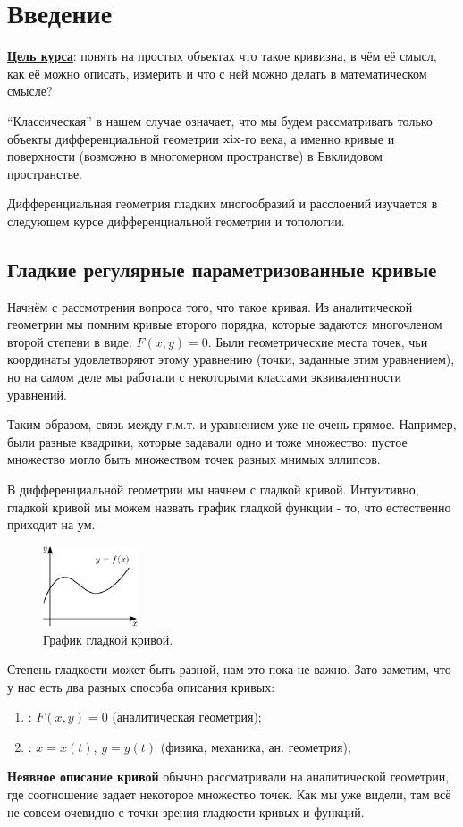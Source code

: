 \documentclass[12pt]{article}
\newcommand{\RN}[1]{%
	\textup{\uppercase\expandafter{\romannumeral#1}}%
}
\theoremstyle{definition}
\begin{document}
\section*{Введение}
\uline{\textbf{Цель курса}}: понять на простых объектах что такое кривизна, в чём её смысл, как её можно описать, измерить и что с ней можно делать в математическом смысле? 

``Классическая'' в нашем случае означает, что мы будем рассматривать только объекты дифференциальной геометрии $\RN{19}$-го века, а именно кривые и поверхности (возможно в многомерном пространстве) в Евклидовом пространстве. 

Дифференциальная геометрия гладких многообразий и расслоений изучается в следующем курсе дифференциальной геометрии и топологии.

\subsection*{Гладкие регулярные параметризованные кривые}
Начнём с рассмотрения вопроса того, что такое кривая. Из аналитической геометрии мы помним кривые второго порядка, которые задаются многочленом второй степени в виде: $F(x,y) = 0$. Были геометрические места точек, чьи координаты удовлетворяют этому уравнению (точки, заданные этим уравнением), но на самом деле мы работали с некоторыми классами эквивалентности уравнений. 

Таким образом, связь между г.м.т. и уравнением уже не очень прямое. Например, были разные квадрики, которые задавали одно и тоже множество: пустое множество могло быть множеством точек разных мнимых эллипсов. 

В дифференциальной геометрии мы начнем с гладкой кривой. Интуитивно, гладкой кривой мы можем назвать график гладкой функции - то, что естественно приходит на ум.

\begin{figure}[H]
	\centering
	\includegraphics[width=0.25\textwidth]{CDGL1_1.eps}
	\caption{График гладкой кривой.}
	\label{1_1}
\end{figure}
Степень гладкости может быть разной, нам это пока не важно. Зато заметим, что у нас есть два разных способа описания кривых:
\begin{enumerate}[label=\arabic*)]
	\item {}: $F(x,y) = 0$ (аналитическая геометрия);
	\item {}: $x = x(t), \, y = y(t)$ (физика, механика, ан. геометрия);
\end{enumerate}
\textbf{Неявное описание кривой} обычно рассматривали на аналитической геометрии, где соотношение задает некоторое множество точек. Как мы уже видели, там всё не совсем очевидно с точки зрения гладкости кривых и функций.
\end{document}
